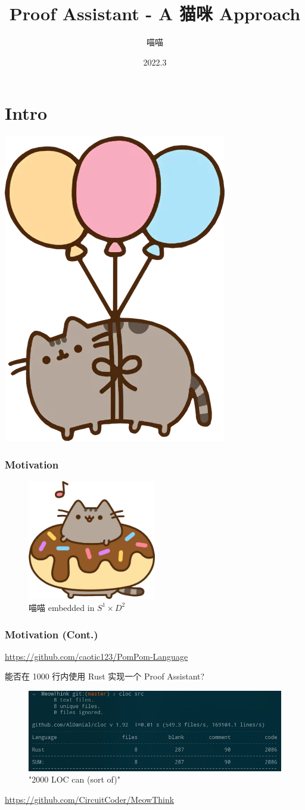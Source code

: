 \documentclass[UTF-8]{ctexbeamer}
\title{Proof Assistant - A 猫咪 Approach}
\author{喵喵}
\date{2022.3}
\begin{document}
\section{Intro}

\begin{frame}
  \titlepage
  \begin{center}
    \includegraphics[width=.1\textwidth]{assets/float.png}
  \end{center}
\end{frame}

\begin{frame}
  \frametitle{Motivation}

  \pause
  \begin{figure}
    \includegraphics[width=0.5\textwidth]{assets/doughnut.png}
    \caption{喵喵 embedded in $S^1 \times D^2$}
  \end{figure}
\end{frame}

\begin{frame}
  \frametitle{Motivation (Cont.)}

  \url{https://github.com/caotic123/PomPom-Language}
  
  \pause

  \vspace{1em}

  能否在 1000 行内使用 Rust 实现一个 Proof Assistant?

  \pause

  \begin{figure}
    \includegraphics[width=\textwidth]{assets/cloc.png}
    \caption{"2000 LOC can (sort of)"}
  \end{figure}

  \url{https://github.com/CircuitCoder/MeowThink}

\end{frame}
\end{document}
